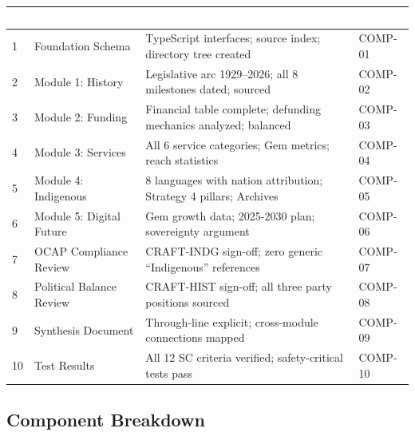 \documentclass[11pt,letterpaper]{article}
\newcommand{\tableheader}[1]{\textbf{\sffamily\textcolor{white}{#1}}}
\begin{document}
\begin{center}
\begin{tabularx}{\textwidth}{C{0.5cm}L{3.5cm}XL{2.5cm}}
\toprule
{}
\tableheader{\#} & \tableheader{Deliverable} & \tableheader{Acceptance Criteria} & \tableheader{Spec} \\
 & Foundation Schema & TypeScript interfaces; source index; directory tree created & COMP-01 \\
2 & Module 1: History & Legislative arc 1929--2026; all 8 milestones dated; sourced & COMP-02 \\
3 & Module 2: Funding & Financial table complete; defunding mechanics analyzed; balanced & COMP-03 \\
4 & Module 3: Services & All 6 service categories; Gem metrics; reach statistics & COMP-04 \\
5 & Module 4: Indigenous & 8 languages with nation attribution; Strategy 4 pillars; Archives & COMP-05 \\
6 & Module 5: Digital Future & Gem growth data; 2025-2030 plan; sovereignty argument & COMP-06 \\
7 & OCAP Compliance Review & CRAFT-INDG sign-off; zero generic ``Indigenous'' references & COMP-07 \\
8 & Political Balance Review & CRAFT-HIST sign-off; all three party positions sourced & COMP-08 \\
9 & Synthesis Document & Through-line explicit; cross-module connections mapped & COMP-09 \\
10 & Test Results & All 12 SC criteria verified; safety-critical tests pass & COMP-10 \\
\bottomrule
\end{tabularx}
\end{center}

\subsection{Component Breakdown}
\end{document}
